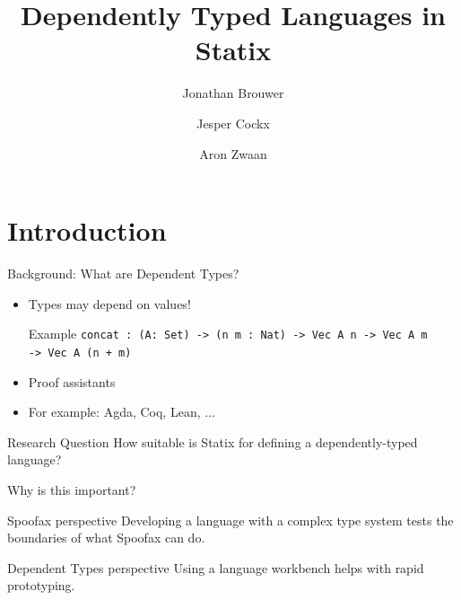\documentclass[aspectratio=43]{beamer}
\title[]{Dependently Typed Languages in Statix}
\institute[]{Delft University of Technology, The Netherlands}
\author{Jonathan Brouwer \and Jesper Cockx \and Aron Zwaan}
\begin{document}
\section{Introduction}
{
\frame{\titlepage}
}

\begin{frame}[fragile]{Background: What are Dependent Types?}
\begin{itemize}
	\item Types may depend on values!
	\begin{exampleblock}{Example}
		\texttt{concat : (A: Set) -> (n m : Nat) -> Vec A n -> Vec A m
			\\ \hspace*{48pt} -> Vec A (n + m)}
	\end{exampleblock}
	\item Proof assistants
	\item For example: Agda, Coq, Lean, ...
\end{itemize}


\end{frame}

\begin{frame}[fragile]{Research Question}
\large{How suitable is Statix for defining a dependently-typed language?}
\end{frame}

\begin{frame}[fragile]{Why is this important?}
	\begin{block}{Spoofax perspective}
		Developing a language with a complex type system tests the boundaries of what Spoofax can do.
	\end{block}
	
	\begin{block}{Dependent Types perspective}
		Using a language workbench helps with rapid prototyping.
	\end{block}
\end{frame}
\end{document}
